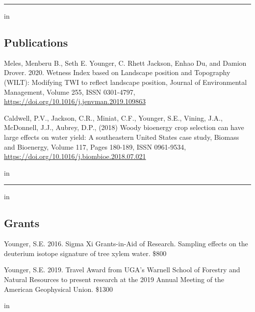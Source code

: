 \documentclass[10pt,letterpaper]{article}
\begin{document}
\pagebreak

\hrule
\vspace{-0.4em}
 in
\subsection*{Publications}

\begin{hangparas}{.25in}{1}

Meles, Menberu B., Seth E. Younger, C. Rhett Jackson, Enhao Du, and Damion Drover. 2020. Wetness Index based on Landscape position and Topography (WILT): Modifying TWI to reflect landscape position, Journal of Environmental Management, Volume 255, ISSN 0301-4797, \url{https://doi.org/10.1016/j.jenvman.2019.109863}

Caldwell, P.V., Jackson, C.R., Miniat, C.F., Younger, S.E., Vining, J.A., McDonnell, J.J., Aubrey, D.P., (2018) Woody bioenergy crop selection can have large effects on water yield: A southeastern United States case study,
Biomass and Bioenergy, Volume 117, Pages 180-189, ISSN 0961-9534, \url{https://doi.org/10.1016/j.biombioe.2018.07.021}

 in
\vspace{-0.4em}

\end{hangparas}

\hrule
\vspace{-0.4em}
 in
\subsection*{Grants}

\begin{hangparas}{.25in}{1}

Younger, S.E. 2016. Sigma Xi Grants-in-Aid of Research. Sampling effects on the deuterium isotope signature of tree xylem water. \$800


Younger, S.E. 2019. Travel Award from UGA's Warnell School of Forestry and Natural Resources to present research at the 2019 Annual Meeting of the American Geophysical Union. \$1300

 in
\vspace{-0.4em}

\end{hangparas}
\end{document}
